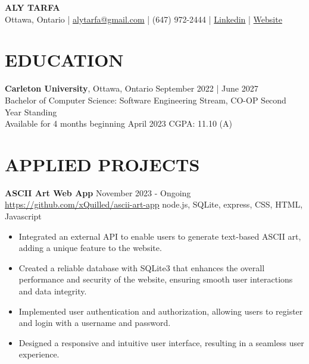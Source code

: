 \documentclass[a4paper,10pt]{extarticle}
\begin{document}
\pagestyle{empty}

\begin{center}
	\textbf{\Large ALY TARFA}\\[2pt]
	Ottawa, Ontario | \href{mailto:alytarfa@gmail.com}{alytarfa@gmail.com} | (647) 972-2444 | \href{https://www.linkedin.com/in/aly-tarfa-b18b59225/}{Linkedin} | \href{https://xquilled.github.io/}{Website}
\end{center}

\section*{EDUCATION}
\noindent
\textbf{Carleton University}, Ottawa, Ontario \hfill September 2022 | June 2027\\
Bachelor of Computer Science: Software Engineering Stream, CO-OP \hfill Second Year Standing\\
Available for 4 months beginning April 2023 \hfill CGPA: 11.10 (A)

\section*{APPLIED PROJECTS}
\noindent
\textbf{ASCII Art Web App} \hfill November 2023 - Ongoing\\
\url{https://github.com/xQuilled/ascii-art-app} \hfill node.js, SQLite, express, CSS, HTML, Javascript
\begin{itemize}
	\item Integrated an external API to enable users to generate text-based ASCII art, adding a unique feature to the website.
	\item Created a reliable database with SQLite3 that enhances the overall performance and security of the website, ensuring smooth user interactions and data integrity.
	\item Implemented user authentication and authorization, allowing users to register and login with a username and password.
	\item Designed a responsive and intuitive user interface, resulting in a seamless user experience.
\end{itemize}
\end{document}
